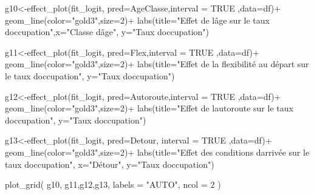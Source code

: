 \documentclass[
]{book}
\newenvironment{Shaded}{\begin{snugshade}}{\end{snugshade}}
\newcommand{\AttributeTok}[1]{\textcolor[rgb]{0.77,0.63,0.00}{#1}}
\newcommand{\ConstantTok}[1]{\textcolor[rgb]{0.00,0.00,0.00}{#1}}
\newcommand{\DecValTok}[1]{\textcolor[rgb]{0.00,0.00,0.81}{#1}}
\newcommand{\FunctionTok}[1]{\textcolor[rgb]{0.00,0.00,0.00}{#1}}
\newcommand{\NormalTok}[1]{#1}
\newcommand{\OtherTok}[1]{\textcolor[rgb]{0.56,0.35,0.01}{#1}}
\newcommand{\SpecialCharTok}[1]{\textcolor[rgb]{0.00,0.00,0.00}{#1}}
\newcommand{\StringTok}[1]{\textcolor[rgb]{0.31,0.60,0.02}{#1}}
\begin{document}
\begin{Shaded}
\begin{Highlighting}[]
\NormalTok{g10}\OtherTok{\textless{}{-}}\FunctionTok{effect\_plot}\NormalTok{(fit\_logit, }\AttributeTok{pred=}\NormalTok{AgeClasse,}\AttributeTok{interval =} \ConstantTok{TRUE}\NormalTok{ ,}\AttributeTok{data=}\NormalTok{df)}\SpecialCharTok{+}
  \FunctionTok{geom\_line}\NormalTok{(}\AttributeTok{color=}\StringTok{"gold3"}\NormalTok{,}\AttributeTok{size=}\DecValTok{2}\NormalTok{)}\SpecialCharTok{+}
  \FunctionTok{labs}\NormalTok{(}\AttributeTok{title=}\StringTok{"Effet de l\textquotesingle{}âge sur le taux d\textquotesingle{}occupation"}\NormalTok{,}\AttributeTok{x=}\StringTok{"Classe d\textquotesingle{}âge"}\NormalTok{,}
       \AttributeTok{y=}\StringTok{"Taux d\textquotesingle{}occupation"}\NormalTok{)}

\NormalTok{g11}\OtherTok{\textless{}{-}}\FunctionTok{effect\_plot}\NormalTok{(fit\_logit, }\AttributeTok{pred=}\NormalTok{Flex,}\AttributeTok{interval =} \ConstantTok{TRUE}\NormalTok{  ,}\AttributeTok{data=}\NormalTok{df)}\SpecialCharTok{+}
  \FunctionTok{geom\_line}\NormalTok{(}\AttributeTok{color=}\StringTok{"gold3"}\NormalTok{,}\AttributeTok{size=}\DecValTok{2}\NormalTok{)}\SpecialCharTok{+}
  \FunctionTok{labs}\NormalTok{(}\AttributeTok{title=}\StringTok{"Effet de la flexibilité au départ sur le taux d\textquotesingle{}occupation"}\NormalTok{,}
       \AttributeTok{y=}\StringTok{"Taux d\textquotesingle{}occupation"}\NormalTok{)}


\NormalTok{g12}\OtherTok{\textless{}{-}}\FunctionTok{effect\_plot}\NormalTok{(fit\_logit, }\AttributeTok{pred=}\NormalTok{Autoroute,}\AttributeTok{interval =} \ConstantTok{TRUE}\NormalTok{  ,}\AttributeTok{data=}\NormalTok{df)}\SpecialCharTok{+}
  \FunctionTok{geom\_line}\NormalTok{(}\AttributeTok{color=}\StringTok{"gold3"}\NormalTok{,}\AttributeTok{size=}\DecValTok{2}\NormalTok{)}\SpecialCharTok{+}
  \FunctionTok{labs}\NormalTok{(}\AttributeTok{title=}\StringTok{"Effet de l\textquotesingle{}autoroute sur le taux d\textquotesingle{}occupation"}\NormalTok{,}
       \AttributeTok{y=}\StringTok{"Taux d\textquotesingle{}occupation"}\NormalTok{)}

\NormalTok{g13}\OtherTok{\textless{}{-}}\FunctionTok{effect\_plot}\NormalTok{(fit\_logit, }\AttributeTok{pred=}\NormalTok{Detour, }\AttributeTok{interval =} \ConstantTok{TRUE}\NormalTok{ ,}\AttributeTok{data=}\NormalTok{df)}\SpecialCharTok{+}
  \FunctionTok{geom\_line}\NormalTok{(}\AttributeTok{color=}\StringTok{"gold3"}\NormalTok{,}\AttributeTok{size=}\DecValTok{2}\NormalTok{)}\SpecialCharTok{+}
  \FunctionTok{labs}\NormalTok{(}\AttributeTok{title=}\StringTok{"Effet des conditions d\textquotesingle{}arrivée sur le taux d\textquotesingle{}occupation"}\NormalTok{, }\AttributeTok{x=}\StringTok{"Détour"}\NormalTok{,}
       \AttributeTok{y=}\StringTok{"Taux d\textquotesingle{}occupation"}\NormalTok{)}

\FunctionTok{plot\_grid}\NormalTok{(}
\NormalTok{  g10, g11,g12,g13,}
  \AttributeTok{labels =} \StringTok{"AUTO"}\NormalTok{, }\AttributeTok{ncol =} \DecValTok{2}
\NormalTok{)}
\end{Highlighting}
\end{Shaded}
\end{document}
